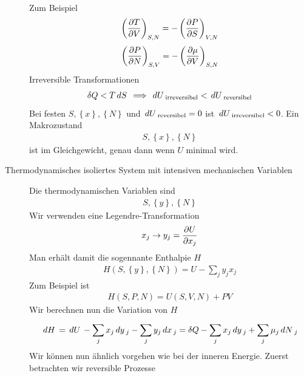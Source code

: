 \begin{description}
\begin{align*}
    \end{align*}
    Zum Beispiel
    \begin{align*}
      \left( \frac{\partial T }{\partial V} \right)_{S, N} = - \left( \frac{\partial P }{\partial S} \right)_{V, N}
    \end{align*}
    \begin{align*}
      \left( \frac{\partial P }{\partial N} \right)_{S, V} = - \left( \frac{\partial \mu }{\partial V} \right)_{S, N}
    \end{align*}
    Irreversible Transformationen 
    \begin{align*}
      \delta Q < T \,dS\, \implies \,dU\,_{\text{irreversibel}} < \,dU\,_{\text{reversibel}}
    \end{align*}
    Bei festen $S, \left\{ x \right\}, \left\{ N \right\}$ und $ \,dU\,_{\text{reversibel}} = 0 $
    ist $ \,dU\,_{\text{irreversibel}} < 0$.
    Ein Makrozustand 
    \begin{align*}
      S, \left\{ x \right\}, \left\{ N \right\}
    \end{align*}
    ist im Gleichgewicht, genau dann wenn $U$ minimal wird.
  \item[Thermodynamisches isoliertes System mit intensiven mechanischen Variablen]
    Die thermodynamischen Variablen sind
    \begin{align*}
      S, \left\{ y \right\}, \left\{ N \right\}
    \end{align*}
    Wir verwenden eine Legendre-Transformation
    \begin{align*}
      x_j \to y_j = \frac{\partial U }{\partial x_j}
    \end{align*}
    Man erhält damit die sogennante Enthalpie $H$
    \begin{align*}
      H(S, \left\{ y \right\}, \left\{ N \right\} ) = U -
      \sum_{j}^{} y_j x_j
    \end{align*}
    Zum Beispiel ist
    \begin{align*}
      H(S, P, N) = U(S, V, N) + PV 
    \end{align*}
    Wir berechnen nun die Variation von $H$
    \begin{align*}
      \,dH\,  = \,dU\, - \sum_{j}^{} x_j \,dy\,_j - \sum_{j}^{} y_j \,dx\,_j 
      = \delta Q - \sum_{j}^{} x_j \,dy\,_j + \sum_{j}^{} \mu_j \,dN\,_j
    \end{align*}
    Wir können nun ähnlich vorgehen wie bei der inneren Energie.
    Zuerst betrachten wir reversible Prozesse
    \begin{align*}

\end{align*}
\end{description}
